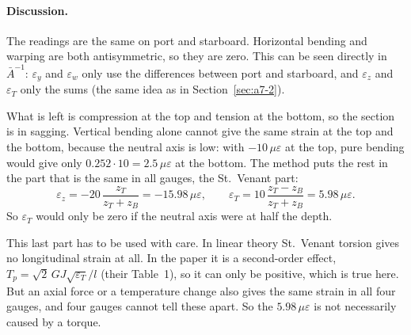 \paragraph{Discussion.} The readings are the same on port and starboard. Horizontal bending and warping are both antisymmetric, so they are zero. This can be seen directly in $\bar A^{-1}$: $\varepsilon_y$ and $\varepsilon_w$ only use the differences between port and starboard, and $\varepsilon_z$ and $\varepsilon_T$ only the sums (the same idea as in Section~\ref{sec:a7-2}).

What is left is compression at the top and tension at the bottom, so the section is in sagging. Vertical bending alone cannot give the same strain at the top and the bottom, because the neutral axis is low: with $-10\,\mu\varepsilon$ at the top, pure bending would give only $0.252\cdot10 = 2.5\,\mu\varepsilon$ at the bottom. The method puts the rest in the part that is the same in all gauges, the St.\ Venant part:
\begin{equation}
  \varepsilon_z = -20\,\frac{z_T}{z_T+z_B} = -15.98\,\mu\varepsilon ,\qquad
  \varepsilon_T = 10\,\frac{z_T-z_B}{z_T+z_B} = 5.98\,\mu\varepsilon .
\end{equation}
So $\varepsilon_T$ would only be zero if the neutral axis were at half the depth.

This last part has to be used with care. In linear theory St.\ Venant torsion gives no longitudinal strain at all. In the paper it is a second-order effect, $T_p = \sqrt{2}\,GJ\sqrt{\varepsilon_T}/l$ (their Table~1), so it can only be positive, which is true here. But an axial force or a temperature change also gives the same strain in all four gauges, and four gauges cannot tell these apart. So the $5.98\,\mu\varepsilon$ is not necessarily caused by a torque.

